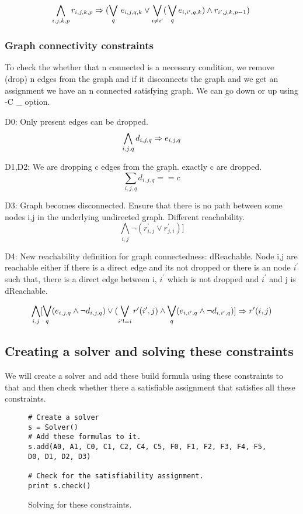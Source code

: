 \[ \bigwedge\limits_{i,j,k,p} r_{i,j,k,p} \Rightarrow (\bigvee_{q} \, e_{i,j,q,k} \lor \bigvee_{i\neq i^{\prime}} ( \, \bigvee_{q} e_{i,i^{\prime},q,k}) \land r_{i^{\prime},j,k,p-1} ) \, \]


\subsubsection{Graph connectivity constraints}
To check the whether that n connected is a necessary condition, we remove (drop) n edges from the graph and if it disconnects the graph and we get an assignment we have an n connected satisfying graph. We can go down or up using -C \_ option.  \newline 

D0: Only present edges can be dropped.
\[ \bigwedge\limits_{i,j,q} d_{i,j,q} \Rightarrow e_{i,j,q}  \]

D1,D2: We are dropping c edges from the graph. exactly c are dropped.
\[ \sum_{i,j,q} d_{i,j,q} == c \]

D3:  Graph becomes disconnected. Ensure that there is no path between some nodes i,j in the underlying undirected graph. Different reachability.
\[ \bigwedge\limits_{i,j} \neg (r^{\prime}_{i,j} \lor r^{\prime}_{j,i})]  \]

D4: New reachability definition for graph connectedness: dReachable. Node i,j are reachable either if there is a direct edge and its not dropped or there is an node $i^{\prime}$ such that, there is a direct edge between i, $i^{\prime}$ which is not dropped and $i^{\prime}$ and j is dReachable.

\[ \bigwedge\limits_{i,j}  [\bigvee_{q} (e_{i,j,q} \land  \neg d_{i,j,q}) \lor  (\bigvee_{i' != i}  r^{\prime}(i',j) \land  \bigvee_{q} (e_{i,i',q} \land \neg d_{i,i',q}) ] \Rightarrow r^{\prime}(i,j)  \]

\subsection{Creating a solver and solving these constraints}
We will create a solver and add these build formula using these constraints to that and then check whether there a satisfiable assignment that satisfies all these constraints.

\begin{figure}[ht]
\begin{verbatim}
# Create a solver
s = Solver()
# Add these formulas to it.
s.add(A0, A1, C0, C1, C2, C4, C5, F0, F1, F2, F3, F4, F5, D0, D1, D2, D3)

# Check for the satisfiability assignment.
print s.check()   
\end{verbatim}
\caption{Solving for these constraints.}
\label{code:motivate}
\end{figure} 



